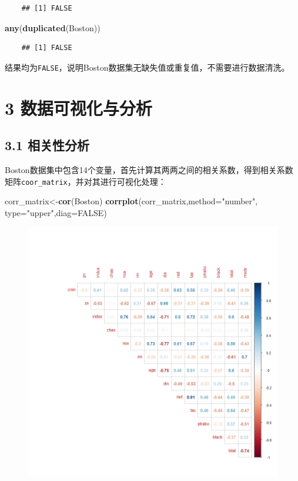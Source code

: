 \documentclass[UTF-8]{ctexart}
\newenvironment{Shaded}{\begin{snugshade}}{\end{snugshade}}
\newcommand{\DataTypeTok}[1]{\textcolor[rgb]{0.13,0.29,0.53}{#1}}
\newcommand{\KeywordTok}[1]{\textcolor[rgb]{0.13,0.29,0.53}{\textbf{#1}}}
\newcommand{\NormalTok}[1]{#1}
\newcommand{\OtherTok}[1]{\textcolor[rgb]{0.56,0.35,0.01}{#1}}
\newcommand{\StringTok}[1]{\textcolor[rgb]{0.31,0.60,0.02}{#1}}
\begin{document}
	\begin{verbatim}
	## [1] FALSE
	\end{verbatim}
	
\begin{Shaded}
\begin{Highlighting}[]
\KeywordTok{any}\NormalTok{(}\KeywordTok{duplicated}\NormalTok{(Boston))}
\end{Highlighting}
\end{Shaded}
	
	\begin{verbatim}
	## [1] FALSE
	\end{verbatim}
	
	结果均为\texttt{FALSE}，说明Boston数据集无缺失值或重复值，不需要进行数据清洗。
	
	\section{3 数据可视化与分析}
	\subsection{3.1 相关性分析}
	Boston数据集中包含14个变量，首先计算其两两之间的相关系数，得到相关系数矩阵\texttt{coor\_matrix}，并对其进行可视化处理：
	
	\begin{Shaded}
		\begin{Highlighting}[]
\NormalTok{corr_matrix<-}\KeywordTok{cor}\NormalTok{(Boston)}
\KeywordTok{corrplot}\NormalTok{(corr_matrix,}\DataTypeTok{method=}\StringTok{"number"}\NormalTok{, }\DataTypeTok{type=}\StringTok{"upper"}\NormalTok{,}\DataTypeTok{diag=}\OtherTok{FALSE}\NormalTok{)}
		\end{Highlighting}
	\end{Shaded}

\begin{figure}[H]
	\centering
	\includegraphics[width=0.9\linewidth]{cormatrix}
	\label{bdc1}
\end{figure}
\end{document}
